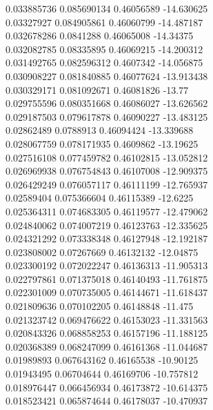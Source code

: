 {0.033885736 0.085690134 0.46056589 -14.630625\\
0.03327927 0.084905861 0.46060799 -14.487187\\
0.032678286 0.0841288 0.46065008 -14.34375\\
0.032082785 0.08335895 0.46069215 -14.200312\\
0.031492765 0.082596312 0.4607342 -14.056875\\
0.030908227 0.081840885 0.46077624 -13.913438\\
0.030329171 0.081092671 0.46081826 -13.77\\
0.029755596 0.080351668 0.46086027 -13.626562\\
0.029187503 0.079617878 0.46090227 -13.483125\\
0.02862489 0.0788913 0.46094424 -13.339688\\
0.028067759 0.078171935 0.4609862 -13.19625\\
0.027516108 0.077459782 0.46102815 -13.052812\\
0.026969938 0.076754843 0.46107008 -12.909375\\
0.026429249 0.076057117 0.46111199 -12.765937\\
0.02589404 0.075366604 0.46115389 -12.6225\\
0.025364311 0.074683305 0.46119577 -12.479062\\
0.024840062 0.074007219 0.46123763 -12.335625\\
0.024321292 0.073338348 0.46127948 -12.192187\\
0.023808002 0.07267669 0.46132132 -12.04875\\
0.023300192 0.072022247 0.46136313 -11.905313\\
0.022797861 0.071375018 0.46140493 -11.761875\\
0.022301009 0.070735005 0.46144671 -11.618437\\
0.021809636 0.070102205 0.46148848 -11.475\\
0.021323742 0.069476622 0.46153023 -11.331563\\
0.020843326 0.068858253 0.46157196 -11.188125\\
0.020368389 0.068247099 0.46161368 -11.044687\\
0.01989893 0.067643162 0.46165538 -10.90125\\
0.01943495 0.06704644 0.46169706 -10.757812\\
0.018976447 0.066456934 0.46173872 -10.614375\\
0.018523421 0.065874644 0.46178037 -10.470937\\
}
